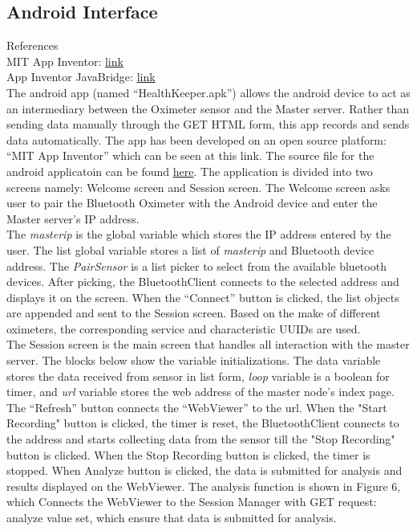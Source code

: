 \documentclass[10pt,journal,compsoc]{IEEEtran}
\begin{document}
\subsection{Android Interface}
References \\
MIT App Inventor: \href{http://appinventor.mit.edu/explore/front.html}{link} \\
App Inventor JavaBridge: \href{http://www.appinventor.org/jBridgeIntro}{link} \\
The android app (named “HealthKeeper.apk”) allows the android device to act as an intermediary between the Oximeter sensor and the Master server. Rather than sending data manually through the GET HTML form, this app records and sends data automatically. The app has been developed on an open source platform: “MIT App Inventor” which can be seen at this link. The source file for the android applicatoin can be found \href{https://drive.google.com/open?id=1rPIf_NHuBXp6peUX3vkzqJg5hfht3KDC}{here}. The application is divided into two screens namely: Welcome screen and Session screen. The Welcome screen asks user to pair the Bluetooth Oximeter with the Android device and enter the Master server’s IP address. \\
The \textit{masterip} is the global variable which stores the IP address entered by the user. The list global variable stores a list of \textit{masterip} and Bluetooth device address. The \textit{PairSensor} is a list picker to select from the available bluetooth devices. After picking, the BluetoothClient connects to the selected address and displays it on the screen. When the “Connect” button is clicked, the list objects are appended and sent to the Session screen. Based on the make of different oximeters, the corresponding service and characteristic UUIDs are used. \\
The Session screen is the main screen that handles all interaction with the master server. The blocks below show the variable initializations. The data variable stores the data received from sensor in list form, \textit{loop} variable is a boolean for timer, and \textit{url} variable stores the web address of the master node’s index page.\\
The “Refresh” button connects the “WebViewer” to the url. When the "Start Recording" button is clicked, the timer is reset, the BluetoothClient connects to the address and starts collecting data from the sensor till the "Stop Recording" button is clicked. When the Stop Recording button is clicked, the timer is stopped. When Analyze button is clicked, the data is submitted for analysis and results displayed on the WebViewer. The analysis function is shown in Figure 6, which Connects the WebViewer to the Session Manager with GET request: analyze value set, which ensure that data is submitted for analysis.
\end{document}
